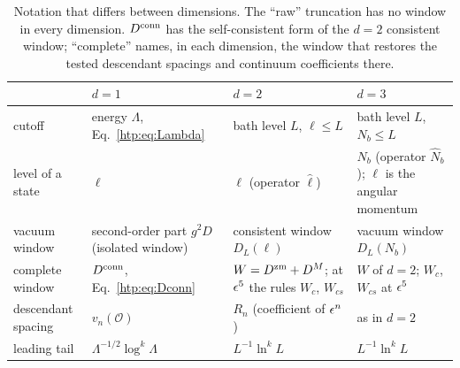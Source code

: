 \begin{table}[ht]
\centering\footnotesize\renewcommand{\arraystretch}{1.2}
\begin{tabular}{@{}p{3.3cm}p{3.6cm}p{4.1cm}p{3.6cm}@{}}
\toprule
 & $d=1$ & $d=2$ & $d=3$ \\
\midrule
cutoff & energy $\Lambda$, Eq.~\eqref{htp:eq:Lambda} & bath level $L$, $\ell\le L$ & bath level $L$, $N_b\le L$ \\
level of a state & $\ell$ & $\ell$ (operator $\hat\ell$) & $N_b$ (operator $\hat N_b$); $\ell$ is the angular momentum \\
vacuum window & second-order part $g^2D$ (isolated window) & consistent window $D_L(\ell)$ & vacuum window $D_L(N_b)$ \\
complete window & $D^{\rm conn}$, Eq.~\eqref{htp:eq:Dconn} & $W=D^{\rm zm}+D^M$; at $\epsilon^5$ the rules $W_c$, $W_{cs}$ & $W$ of $d=2$; $W_c$, $W_{cs}$ at $\epsilon^5$ \\
descendant spacing & $v_n(\mathcal O)$ & $R_n$ (coefficient of $\epsilon^n$) & as in $d=2$ \\
leading tail & $\Lambda^{-1/2}\log^k\Lambda$ & $L^{-1}\ln^kL$ & $L^{-1}\ln^kL$ \\
\bottomrule
\end{tabular}
\caption{Notation that differs between dimensions. The ``raw'' truncation has no window in every dimension. $D^{\rm conn}$
has the self-consistent form of the $d=2$ consistent window; ``complete'' names, in each dimension, the window that
restores the tested descendant spacings and continuum coefficients there.}
\label{htp:tab:notation}
\end{table}
